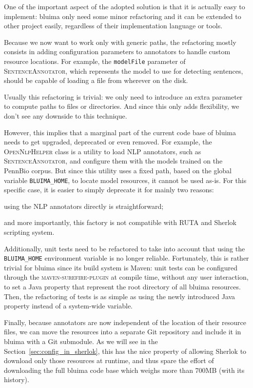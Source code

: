 \documentclass{article}
\newcommand{\ID}[1]{{\textsc{#1}}}
\newcommand{\VAR}[1]{\mbox{\texttt{#1}}}
\begin{document}
One of the important aspect of the adopted solution is that it is actually easy to implement: bluima
only need some minor refactoring and it can be extended to other project easily, regardless of their
implementation language or tools.

Because we now want to work only with generic paths, the refactoring mostly consists in adding
configuration parameters to annotators to handle custom resource locations. For example, the
\VAR{modelFile} parameter of \ID{Sentence\-Annotator}, which represents the model to use for
detecting sentences, should be capable of loading a file from wherever on the disk.

Usually this refactoring is trivial: we only need to introduce an extra parameter to compute paths
to files or directories. And since this only adds flexibility, we don't see any downside to this
technique.

However, this implies that a marginal part of the current code base of bluima needs to get upgraded,
deprecated or even removed. For example, the \ID{OpenNlp\-Helper} class is a utility to load NLP
annotators, such as \ID{Sentence\-Annotator}, and configure them with the models trained on the
PennBio corpus. But since this utility uses a fixed path, based on the global variable
\VAR{BLUIMA\_HOME}, to locate model resources, it cannot be used as-is. For this specific case, it
is easier to simply deprecate it for mainly two reasons:
\begin{enumerate*}[label=\itshape\alph*\upshape)]
    \item using the NLP annotators directly is straightforward;
    \item and more importantly, this factory is not compatible with RUTA and Sherlok scripting system.
\end{enumerate*}

Additionally, unit tests need to be refactored to take into account that using the
\VAR{BLUIMA\_HOME} environment variable is no longer reliable. Fortunately, this is rather trivial
for bluima since its build system is Maven: unit tests can be configured through the
\ID{maven-surefire-plugin} at compile time, without any user interaction, to set a Java property
that represent the root directory of all bluima resources. Then, the refactoring of tests is as
simple as using the newly introduced Java property instead of a system-wide variable.

Finally, because annotators are now independent of the location of their resource files, we can move
the resources into a separate Git repository and include it in bluima with a Git submodule. As we
will see in the Section~\ref{sec:config_in_sherlok}, this has the nice property of allowing Sherlok
to download only those resources at runtime, and thus spare the effort of downloading the full
bluima code base which weighs more than 700MB (with its history).
\end{document}
